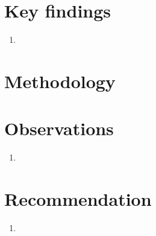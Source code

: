 \documentclass{nrepport}
\title{}
\begin{document}

\section*{Key findings}

\begin{enumerate}
	\item
\end{enumerate}


\section{Methodology}




\section{Observations}

\begin{enumerate}
	\item
\end{enumerate}


\section{Recommendation}

\begin{enumerate}
	\item 
\end{enumerate}
\end{document}
